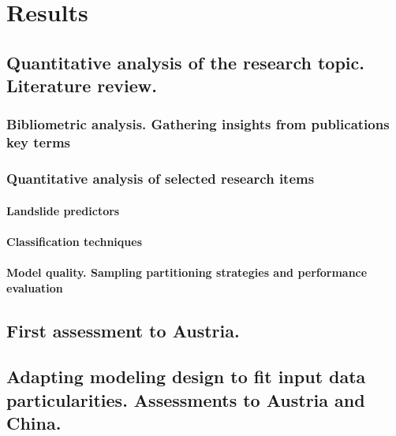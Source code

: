 
\chapter{Results}\label{results} 	
{\textcolor{red}{ \lipsum[1]}}

\section{Quantitative analysis of the research topic. Literature review.} 
{\textcolor{red}{ \lipsum[1]}}

\subsection{Bibliometric analysis. Gathering insights from publications key terms}
{\textcolor{red}{ \lipsum[1]}}


\subsection{Quantitative analysis of selected research items}
{\textcolor{red}{ \lipsum[1]}}

\subsubsection*{Landslide predictors}
{\textcolor{red}{ \lipsum[1]}}

\subsubsection*{Classification techniques}

{\textcolor{red}{ \lipsum[1]}}

\subsubsection*{Model quality. Sampling partitioning strategies and performance evaluation}

{\textcolor{red}{ \lipsum[1]}}


\section{First assessment to Austria.}\label{results_WLF}
{\textcolor{red}{ \lipsum[1]}}


\section{Adapting modeling design to fit input data particularities. Assessments to Austria and China.}
